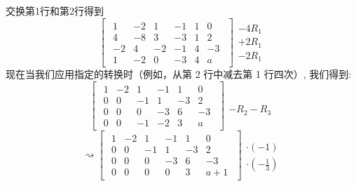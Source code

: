 \begin{example}
    交换第1行和第2行得到
    \[
    \begin{bmatrix}
        \begin{array}{rrrrr|r}
            1 & −2 & 1 & -1 & 1 & 0 \\
            4 & −8 & 3 & −3 & 1 &  2 \\
            −2 & 4 & −2 & −1 & 4 & −3 \\
            1 & -2 & 0 & -3 & 4 & a
        \end{array}
    \end{bmatrix}
    \begin{array}{l}
        \\
        -4R_1\\
        +2R_1\\
        -2R_1\\
    \end{array}
    \]
    现在当我们应用指定的转换时（例如，从第 2 行中减去第 1 行四次）, 我们得到:
    \[
    \begin{bmatrix}
        \begin{array}{rrrrr|r}
            1  & −2 &  1 & -1 &  1 &  0 \\
            0  &  0 & -1 &  1 & -3 &  2 \\
            0  &  0 &  0 & −3 &  6 & −3 \\
            0  &  0 & -1 & -2 &  3 &  a
        \end{array}
    \end{bmatrix}
    \begin{array}{l}
        \\\\\\
        -R_2-R_3\\
    \end{array}
    \]
    \[
    \rightsquigarrow
    \begin{bmatrix}
        \begin{array}{rrrrr|r}
            1  & −2 &  1 & -1 &  1 &  0 \\
            0  &  0 & -1 &  1 & -3 &  2 \\
            0  &  0 &  0 & −3 &  6 & −3 \\
            0  &  0 &  0 &  0 &  3 & a+1
        \end{array}
    \end{bmatrix}
    \begin{array}{l}
        \\
        \cdot (-1) \\
        \cdot (-\frac{1}{3})

\end{array}\]
\end{example}
